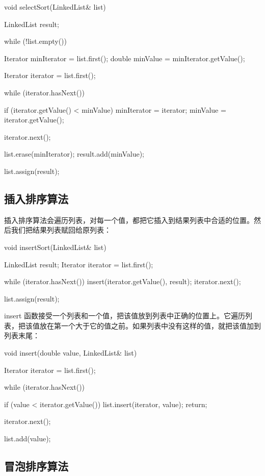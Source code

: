 \begin{codebox}
void selectSort(LinkedList& list) {
  LinkedList result;

  while (!list.empty()) {
    Iterator minIterator = list.first();
    double minValue = minIterator.getValue();

    Iterator iterator = list.first();

    while (iterator.hasNext()) {
      if (iterator.getValue() < minValue) {
        minIterator = iterator;
        minValue = iterator.getValue();
      }

      iterator.next();
    }

    list.erase(minIterator);
    result.add(minValue);
  }

  list.assign(result);
}
\end{codebox}

\subsection{插入排序算法}

插入排序算法会遍历列表，对每一个值，都把它插入到结果列表中合适的位置。然后我们把结果列表赋回给原列表：

\begin{codebox}
void insertSort(LinkedList& list) {
  LinkedList result;
  Iterator iterator = list.first();

  while (iterator.hasNext()) {
    insert(iterator.getValue(), result);
    iterator.next();
  }

  list.assign(result);
}
\end{codebox}

insert 函数接受一个列表和一个值，把该值放到列表中正确的位置上。它遍历列表，把该值放在第一个大于它的值之前。如果列表中没有这样的值，就把该值加到列表末尾：

\begin{codebox}
void insert(double value, LinkedList& list) {
  Iterator iterator = list.first();

  while (iterator.hasNext()) {
    if (value < iterator.getValue()) {
      list.insert(iterator, value);
      return;
    }

    iterator.next();
  }

  list.add(value);
}
\end{codebox}

\subsection{冒泡排序算法}

